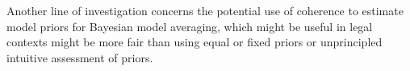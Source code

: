 \documentclass[10pt,]{scrartcl}
\begin{document}
Another line of investigation concerns
the potential use of coherence to   estimate model priors for Bayesian model averaging, which might be useful in legal contexts might be more fair  than using equal or fixed priors or unprincipled intuitive assessment of priors. 






























\end{document}
